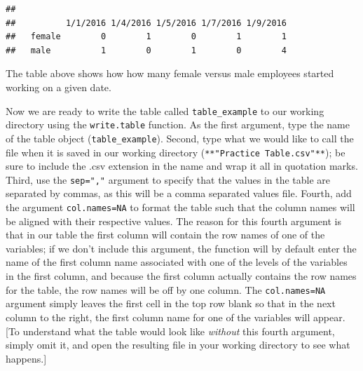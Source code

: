 \documentclass[]{book}
\newenvironment{Shaded}{\begin{snugshade}}{\end{snugshade}}
\newcommand{\KeywordTok}[1]{\textcolor[rgb]{0.13,0.29,0.53}{\textbf{#1}}}
\newcommand{\StringTok}[1]{\textcolor[rgb]{0.31,0.60,0.02}{#1}}
\newcommand{\CommentTok}[1]{\textcolor[rgb]{0.56,0.35,0.01}{\textit{#1}}}
\newcommand{\OperatorTok}[1]{\textcolor[rgb]{0.81,0.36,0.00}{\textbf{#1}}}
\newcommand{\NormalTok}[1]{#1}
\begin{document}
\begin{Shaded}
\end{Shaded}

\begin{verbatim}
##         
##          1/1/2016 1/4/2016 1/5/2016 1/7/2016 1/9/2016
##   female        0        1        0        1        1
##   male          1        0        1        0        4
\end{verbatim}

The table above shows how how many female versus male employees started
working on a given date.

Now we are ready to write the table called \texttt{table\_example} to
our working directory using the \texttt{write.table} function. As the
first argument, type the name of the table object
(\texttt{table\_example}). Second, type what we would like to call the
file when it is saved in our working directory
(\texttt{**"Practice\ Table.csv"**}); be sure to include the .csv
extension in the name and wrap it all in quotation marks. Third, use the
\texttt{sep=","} argument to specify that the values in the table are
separated by commas, as this will be a comma separated values file.
Fourth, add the argument \texttt{col.names=NA} to format the table such
that the column names will be aligned with their respective values. The
reason for this fourth argument is that in our table the first column
will contain the row names of one of the variables; if we don't include
this argument, the function will by default enter the name of the first
column name associated with one of the levels of the variables in the
first column, and because the first column actually contains the row
names for the table, the row names will be off by one column. The
\texttt{col.names=NA} argument simply leaves the first cell in the top
row blank so that in the next column to the right, the first column name
for one of the variables will appear. {[}To understand what the table
would look like \emph{without} this fourth argument, simply omit it, and
open the resulting file in your working directory to see what
happens.{]}
\end{document}
